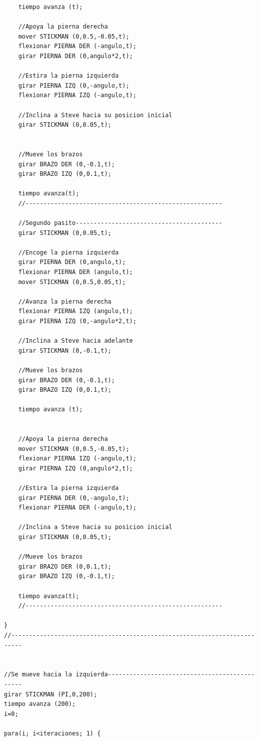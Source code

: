 \documentclass[a4paper, 12pt]{book}
\begin{document}
\begin{itemize}
\begin{verbatim}
    tiempo avanza (t);

    //Apoya la pierna derecha
    mover STICKMAN (0,0.5,-0.05,t);
    flexionar PIERNA DER (-angulo,t);
    girar PIERNA DER (0,angulo*2,t);

    //Estira la pierna izquierda
    girar PIERNA IZQ (0,-angulo,t);
    flexionar PIERNA IZQ (-angulo,t);

    //Inclina a Steve hacia su posicion inicial
    girar STICKMAN (0,0.05,t);

    
    //Mueve los brazos
    girar BRAZO DER (0,-0.1,t);
    girar BRAZO IZQ (0,0.1,t);
    
    tiempo avanza(t);
    //-------------------------------------------------------

    //Segundo pasito-----------------------------------------
    girar STICKMAN (0,0.05,t);
    
    //Encoge la pierna izquierda
    girar PIERNA DER (0,angulo,t);
    flexionar PIERNA DER (angulo,t);
    mover STICKMAN (0,0.5,0.05,t);

    //Avanza la pierna derecha
    flexionar PIERNA IZQ (angulo,t);
    girar PIERNA IZQ (0,-angulo*2,t);

    //Inclina a Steve hacia adelante
    girar STICKMAN (0,-0.1,t);

    //Mueve los brazos
    girar BRAZO DER (0,-0.1,t);
    girar BRAZO IZQ (0,0.1,t);

    tiempo avanza (t);


    //Apoya la pierna derecha
    mover STICKMAN (0,0.5,-0.05,t);
    flexionar PIERNA IZQ (-angulo,t);
    girar PIERNA IZQ (0,angulo*2,t);

    //Estira la pierna izquierda
    girar PIERNA DER (0,-angulo,t);
    flexionar PIERNA DER (-angulo,t);

    //Inclina a Steve hacia su posicion inicial
    girar STICKMAN (0,0.05,t);
    
    //Mueve los brazos
    girar BRAZO DER (0,0.1,t);
    girar BRAZO IZQ (0,-0.1,t);

    tiempo avanza(t);
    //-------------------------------------------------------

}
//-------------------------------------------------------------------------


//Se mueve hacia la izquierda----------------------------------------------
girar STICKMAN (PI,0,200);
tiempo avanza (200);
i=0;

para(i; i<iteraciones; 1) {


\end{verbatim}
\end{itemize}
\end{document}
